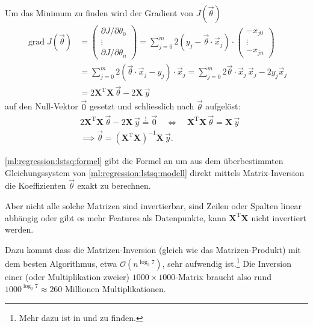Um das Minimum zu finden wird der Gradient von $J(\vec \theta)$ 
\begin{align}
    \operatorname{grad} J(\vec \theta) &=
    \begin{pmatrix} \partial J / \partial \theta_0 \\ \vdots \\ \partial J / \partial \theta_n \end{pmatrix}
    = \sum_{j = 0}^{m} 2 (y_j - \vec \theta \cdot \vec x_j) \cdot
    \begin{pmatrix} - x_{j0}\\ \vdots \\ - x_{jn} \end{pmatrix} \nonumber\\
    &= \sum_{j = 0}^{m} 2 \left( \vec \theta \cdot \vec x_j - y_j \right) \cdot \vec x_j
    = \sum_{j = 0}^{m} 2 \vec \theta \cdot \vec x_j\, \vec x_j - 2 y_j \vec x_j \nonumber\\
    &= 2 \mathbf{X}^\mathrm{T} \mathbf{X}\, \vec \theta - 2 \mathbf{X}\, \vec y
    \label{ml:regression:lstsq:grad}
\end{align}
auf den Null-Vektor $\vec 0$ gesetzt
und schliesslich nach $\vec \theta$ aufgelöst:
\begin{align}
    &2\mathbf{X}^\mathrm{T} \mathbf{X}\, \vec \theta - 2 \mathbf{X}\, \vec y \overset{!}= \vec 0 \quad\Leftrightarrow\quad
    \mathbf{X}^\mathrm{T} \mathbf{X}\, \vec \theta = \mathbf{X}\, \vec y \nonumber\\
    &\implies \vec \theta = \left( \mathbf{X}^\mathrm{T} \mathbf{X} \right)^{-1} \mathbf{X} \, \vec y.
    \label{ml:regression:lstsq:formel}
\end{align}

\eqref{ml:regression:lstsq:formel} gibt die Formel an um aus dem überbestimmten
Gleichungssystem von \eqref{ml:regression:lstsq:modell} direkt mittels Matrix-Inversion
die Koeffizienten $\vec \theta$ exakt zu berechnen.

\bigskip
Aber nicht alle solche Matrizen sind invertierbar, sind Zeilen oder Spalten linear
abhängig oder gibt es mehr Features als Datenpunkte, kann $\mathbf{X}^\mathrm{T}\mathbf{X}$
nicht invertiert werden.

Dazu kommt dass die Matrizen-Inversion (gleich wie das Matrizen-Produkt) mit dem besten
Algorithmus, etwa $\mathcal{O}(n^{\log_2 7})$, sehr aufwendig ist.\footnote{Mehr dazu ist
in \cite{ml:computational-complexity-math-op} und
\cite{ml:computational-complexity-matrix-mult} zu finden.} Die Inversion  einer (oder
Multiplikation zweier) $1000 \times 1000$-Matrix braucht also rund $1000^{\log_2 7}
\approx 260$ Millionen Multiplikationen.

